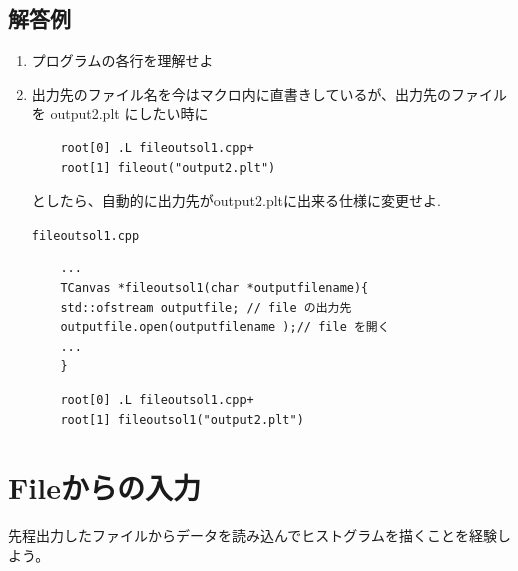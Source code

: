 \documentclass{jarticle}
\begin{document}
  \subsection{解答例}
  \begin{enumerate}
   \item プログラムの各行を理解せよ

   \item  出力先のファイル名を今はマクロ内に直書きしているが、出力先のファイルを output2.plt にしたい時に
\begin{verbatim}
	root[0] .L fileoutsol1.cpp+
	root[1] fileout("output2.plt") 
\end{verbatim}
	  としたら、自動的に出力先がoutput2.pltに出来る仕様に変更せよ.

	  \begin{itembox}{\texttt{fileoutsol1.cpp}}
\begin{verbatim}
	...
	TCanvas *fileoutsol1(char *outputfilename){
	std::ofstream outputfile; // file の出力先
	outputfile.open(outputfilename );// file を開く
	...
	}
\end{verbatim}
	  \end{itembox}

\begin{verbatim}
	root[0] .L fileoutsol1.cpp+
	root[1] fileoutsol1("output2.plt") 
\end{verbatim} 

  \end{enumerate}


  \clearpage

 \section{Fileからの入力}
 先程出力したファイルからデータを読み込んでヒストグラムを描くことを経験しよう。
\end{document}
